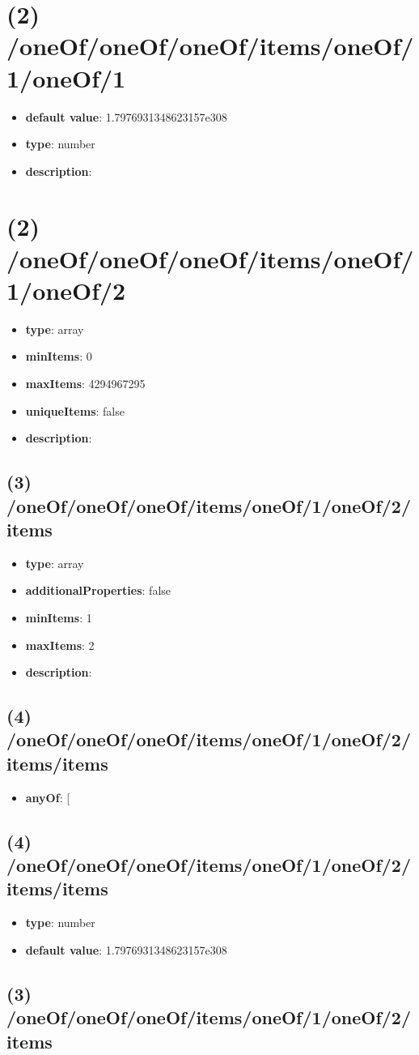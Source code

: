 \section{(2) /oneOf/oneOf/oneOf/items/oneOf/1/oneOf/1}
\begin{itemize}[leftmargin=2em]\item {\bf default value}: 1.7976931348623157e308
\item {\bf type}: number
\item {\bf description}: 
\end{itemize}\section{(2) /oneOf/oneOf/oneOf/items/oneOf/1/oneOf/2}
\begin{itemize}[leftmargin=2em]\item {\bf type}: array
\item {\bf minItems}: 0
\item {\bf maxItems}: 4294967295
\item {\bf uniqueItems}: false
\item {\bf description}: 
\end{itemize}\subsection{(3) /oneOf/oneOf/oneOf/items/oneOf/1/oneOf/2/items}
\begin{itemize}[leftmargin=3em]\item {\bf type}: array
\item {\bf additionalProperties}: false
\item {\bf minItems}: 1
\item {\bf maxItems}: 2
\item {\bf description}: 
\end{itemize}\subsection{(4) /oneOf/oneOf/oneOf/items/oneOf/1/oneOf/2/items/items}
\begin{itemize}[leftmargin=4em]\item {\bf anyOf}: [\end{itemize}\subsection{(4) /oneOf/oneOf/oneOf/items/oneOf/1/oneOf/2/items/items}
\begin{itemize}[leftmargin=4em]\item {\bf type}: number\item {\bf default value}: 1.7976931348623157e308
\end{itemize}\subsection{(3) /oneOf/oneOf/oneOf/items/oneOf/1/oneOf/2/items}

